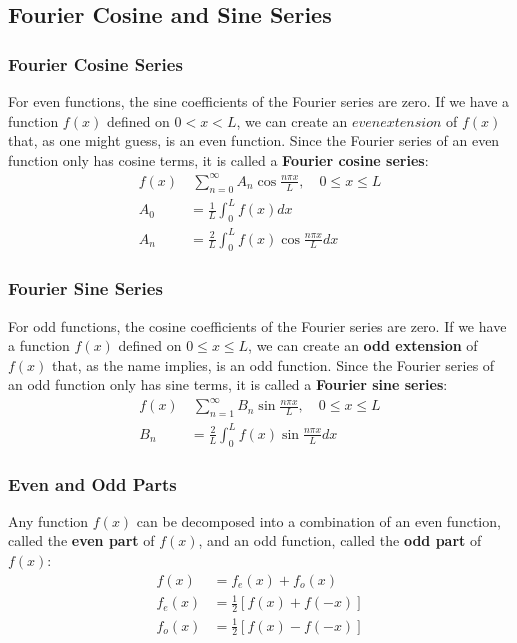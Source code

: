 \documentclass{article}
\begin{document}
\subsection{Fourier Cosine and Sine Series}
\subsubsection{Fourier Cosine Series}
For even functions, the sine coefficients of the Fourier series are zero. If we have a function \(f(x)\) 
defined on \(0<x<L\), we can create an \(even extension\) of \(f(x)\) that, as one might guess, is an even function. Since the Fourier series 
of an even function only has cosine terms, it is called a \textbf{Fourier cosine series}:
\begin{align*}
    f(x)&~\sum_{n=0}^{\infty} A_n \cos \frac{n \pi x}{L}, \quad 0\leq x \leq L \\
    A_0&=\frac{1}{L}\int_{0}^L f(x)dx \\
    A_n&=\frac{2}{L}\int_0^L f(x)\cos \frac{n \pi x}{L}dx
\end{align*}

\subsubsection{Fourier Sine Series}
For odd functions, the cosine coefficients of the Fourier series are zero. If we have a function \(f(x)\) defined on \(0 \leq x \leq L\), 
we can create an \textbf{odd extension} of \(f(x)\) that, as the name implies, is an odd function. Since the Fourier series of 
an odd function only has sine terms, it is called a \textbf{Fourier sine series}:
\begin{align*}
    f(x)&~\sum_{n=1}^{\infty} B_n \sin \frac{n \pi  x}{L}, \quad 0\leq x \leq L \\
    B_n&=\frac{2}{L}\int_{0}^L f(x)\sin \frac{n \pi  x}{L} dx
\end{align*}

\subsubsection{Even and Odd Parts}
Any function \(f(x)\) can be decomposed into a combination of an even function, called the \textbf{even part} of \(f(x)\), and an odd function, called the \textbf{odd part}  of \(f(x)\): 
\begin{align*}
    f(x)&=f_e(x)+f_o(x)\\
    f_e(x)&=\frac{1}{2}[f(x)+f(-x)]\\
    f_o(x)&=\frac{1}{2}[f(x)-f(-x)]
\end{align*}
\end{document}
